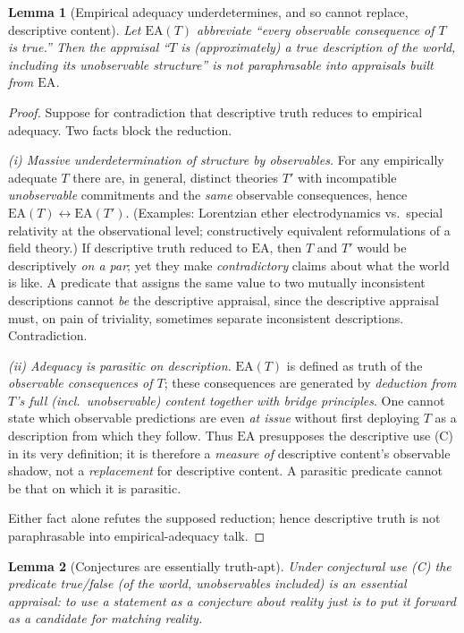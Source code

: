 \documentclass{amsart}
\theoremstyle{definition}
\theoremstyle{plain}
\newtheorem{lemma}{Lemma}
\begin{document}
\begin{lemma}[Empirical adequacy underdetermines, and so cannot replace,
descriptive content]\label{lem:adequacy}
Let $\mathrm{EA}(T)$ abbreviate ``every observable consequence of $T$ is
true.'' Then the appraisal ``$T$ is (approximately) a true description of the
world, including its unobservable structure'' is not paraphrasable into
appraisals built from $\mathrm{EA}$.
\end{lemma}

\begin{proof}
Suppose for contradiction that descriptive truth reduces to empirical adequacy.
Two facts block the reduction.

\emph{(i) Massive underdetermination of structure by observables.} For any
empirically adequate $T$ there are, in general, distinct theories $T'$ with
incompatible \emph{unobservable} commitments and the \emph{same} observable
consequences, hence $\mathrm{EA}(T)\leftrightarrow\mathrm{EA}(T')$. (Examples:
Lorentzian ether electrodynamics vs.\ special relativity at the observational
level; constructively equivalent reformulations of a field theory.) If
descriptive truth reduced to $\mathrm{EA}$, then $T$ and $T'$ would be
descriptively \emph{on a par}; yet they make \emph{contradictory} claims about
what the world is like. A predicate that assigns the same value to two
mutually inconsistent descriptions cannot \emph{be} the descriptive appraisal,
since the descriptive appraisal must, on pain of triviality, sometimes
separate inconsistent descriptions. Contradiction.

\emph{(ii) Adequacy is parasitic on description.} $\mathrm{EA}(T)$ is defined
as truth of the \emph{observable consequences of $T$}; these consequences are
generated by \emph{deduction from $T$'s full (incl.\ unobservable) content
together with bridge principles}. One cannot state which observable predictions
are even \emph{at issue} without first deploying $T$ as a description from which
they follow. Thus $\mathrm{EA}$ presupposes the descriptive use (C) in its very
definition; it is therefore a \emph{measure of} descriptive content's
observable shadow, not a \emph{replacement} for descriptive content. A
parasitic predicate cannot be that on which it is parasitic.

Either fact alone refutes the supposed reduction; hence descriptive truth is
not paraphrasable into empirical-adequacy talk.
\end{proof}

\begin{lemma}[Conjectures are essentially truth-apt]\label{lem:conj-true}
Under conjectural use \textup{(C)} the predicate \emph{true/false} (of the
world, unobservables included) is an essential appraisal: to use a statement as
a conjecture about reality \emph{just is} to put it forward as a candidate for
matching reality.
\end{lemma}
\end{document}
